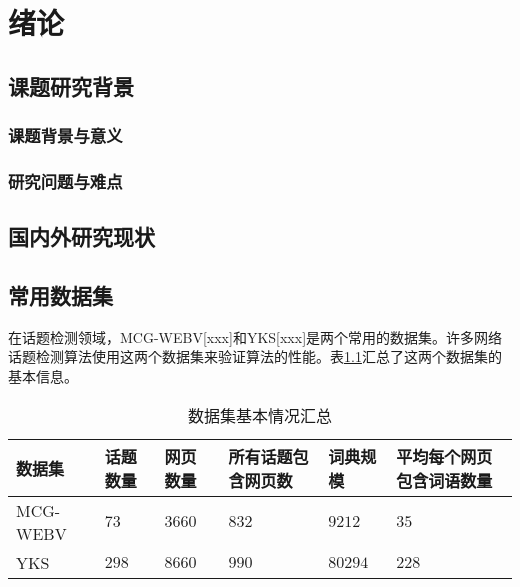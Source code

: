 \chapter{绪论}\label{chap:introduction}

\section{课题研究背景}
\subsection{课题背景与意义}
\subsection{研究问题与难点}



\section{国内外研究现状}



\section{常用数据集}

在话题检测领域，MCG-WEBV[xxx]和YKS[xxx]是两个常用的数据集。许多网络话题检测算法使用这两个数据集来验证算法的性能。表\ref{tab:dataset}汇总了这两个数据集的基本信息。
\begin{table}[!htbp]
    \caption{数据集基本情况汇总}
    \label{tab:dataset}
    \centering
    \begin{tabular}{|p{2.35cm}<{\centering}|p{1cm}<{\centering}|p{1cm}<{\centering}|p{2.5cm}<{\centering}|p{1cm}<{\centering}|p{3cm}<{\centering}|}
        \hline
        数据集 & 话题数量 & 网页数量 & 所有话题包含网页数 & 词典规模 & 平均每个网页包含词语数量\\
        \hline
        \hline
        MCG-WEBV & $73$ & $3660$ & $832$ & $9212$ & $35$\\
        \hline
        YKS & $298$ & $8660$ & $990$ & $80294$ & $228$\\
        \hline
    \end{tabular}
\end{table}

